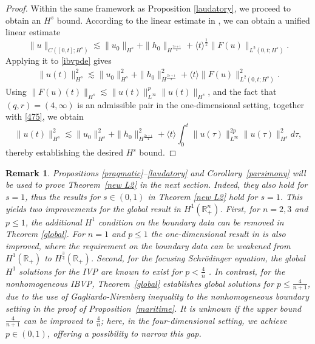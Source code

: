 \documentclass[preprint,compress,12pt]{elsarticle}
\newtheorem{remark}[theorem]{Remark}
\numberwithin{equation}{section}
\begin{document}
\begin{proof}
	Within the same framework as Proposition \ref{laudatory}, we proceed to obtain an $H^{s}$ bound. According to the linear estimate in \cite{figment}, we can obtain a unified linear estimate
	\begin{equation*}
		\|u\|_{C([0,t];H^{s})} \lesssim  \|u_{0}\|_{H^{s}}+ \|h_{0}\|_{H^{\frac{2s+1}{4}}}+ \langle t\rangle^{\frac{1}{2}} \|F(u)\|_{L^{2}(0,t;H^{s})}.
	\end{equation*}
	Applying it to \eqref{ibvpde} gives
	\begin{equation}\label{475}
		\begin{aligned}
			\|u(t)\|_{H^{s}}^{2}\lesssim  \|u_{0}\|_{H^{s}}^{2}+\|h_{0}\|_{H^{\frac{2s+1}{4} }}^{2}+ \langle t\rangle \|F(u)\|^2_{L^{2}(0,t;H^{s})}.
		\end{aligned}
	\end{equation}
	Using  $\|F(u)(t)\|_{H^{s}}\lesssim \|u(t)\|_{L^{\infty}}^{p} \|u(t)\|_{H^{s}}$, and the fact that $(q,r)=(4,\infty)$ is an admissible pair in the one-dimensional setting, together with \eqref{475}, we obtain
	\begin{equation}
		\|u(t)\|_{H^{s}}^{2}\lesssim \|u_{0}\|_{H^{s}}^{2}+\|h_{0}\|_{H^{\frac{2s+1}{4} }}^{2}+\langle t\rangle \int_{0}^{t}\|u(\tau)\|_{L^{\infty}}^{2p} \|u(\tau)\|_{H^{s}}^{2}d\tau,
	\end{equation}
	thereby establishing the desired $H^{s}$ bound.
\end{proof}
\begin{remark}
	Propositions \ref{pragmatic}--\ref{laudatory} and Corollary~\ref{parsimony} will be used to prove Theorem~\ref{new L2} in the next section. Indeed, they also hold for $s=1$, thus the results for $s\in (0,1)$ in Theorem \ref{new L2} hold for $s=1$. This yields two improvements for the global result in  $H^{1}(\mathbb{R}^{n}_{+})$. First, for $n=2,3$ and $p\leq1$, the additional $H^{1}$ condition on the boundary data can be removed in Theorem \ref{global}. For $n=1$ and $p\leq1$ the one-dimensional result in \cite{figment} is also improved, where the requirement on the boundary data can be weakened from $H^{1}(\mathbb{R}_{+})$ to $ H^{\frac{3}{4}}(\mathbb{R}_{+})$. Second, for the focusing Schr\"{o}dinger equation, the  global  $H^{1}$ solutions for the IVP are known to exist   for $p< \frac{4}{n}$  \cite{Ginibre}. In contrast, for the nonhomogeneous IBVP, Theorem~\ref{global} establishes global solutions for  $p\leq\frac{4}{n+1}$, due to the use of  Gagliardo-Nirenberg inequality to the nonhomogeneous boundary setting in the proof of Proposition~\ref{maritime}. It is unknown if the upper bound $\frac{4}{n+1}$ can be improved to  $\frac{4}{n}$; here, in the four-dimensional setting, we achieve $p\in(0,1)$, offering a possibility to narrow this gap.
\end{remark}
\end{document}
